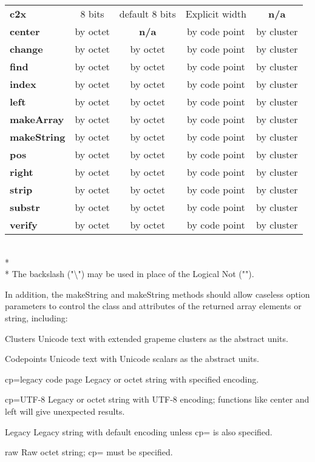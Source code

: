 \documentclass[b4paper]{article}
\begin{document}
\begin{tabular}{| l | c | c | c | c |}
\textbf{c2x}         & 8 bits           & default 8 bits   & Explicit width & \textbf{n/a}  \\
\textbf{center}      & by octet         & \textbf{n/a}     & by code point  & by cluster    \\
\textbf{change}      & by octet         & by octet         & by code point  & by cluster    \\
\textbf{find}        & by octet         & by octet         & by code point  & by cluster    \\
\textbf{index}       & by octet         & by octet         & by code point  & by cluster    \\
\textbf{left}        & by octet         & by octet         & by code point  & by cluster    \\
\textbf{makeArray}   & by octet         & by octet         & by code point  & by cluster    \\
\textbf{makeString}  & by octet         & by octet         & by code point  & by cluster    \\
\textbf{pos}         & by octet         & by octet         & by code point  & by cluster    \\
\textbf{right}       & by octet         & by octet         & by code point  & by cluster    \\
\textbf{strip}       & by octet         & by octet         & by code point  & by cluster    \\
\textbf{substr}      & by octet         & by octet         & by code point  & by cluster    \\
\textbf{verify}      & by octet         & by octet         & by code point  & by cluster    \\
\hline
\end{tabular}
\\*
\\*
The backslash ("\textbackslash") may be used in place of the Logical Not ("\neg").

In addition, the makeString and makeString methods should allow caseless option
parameters to control the class and attributes of the returned array
elements or string, including:

\begin{definition}
\item [Clusters] Unicode text with extended grapeme clusters as the abstract units.
\item [Codepoints] Unicode text with Unicode scalars as the abstract units.
\item [cp=legacy code page] Legacy or octet string with specified encoding.
\item [cp=UTF-8]
Legacy or octet string with UTF-8 encoding;
functions like center and left will give unexpected results.
\item [Legacy] Legacy string with default encoding unless cp= is also specified.
\item [raw] Raw octet string; cp= must be specified.
\end{definition}
\end{document}

